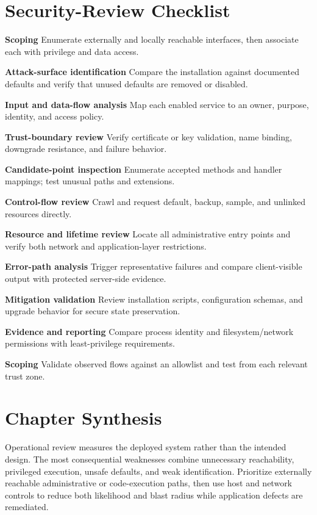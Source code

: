 \documentclass[11pt,letterpaper]{article}
\begin{document}
\section{Security-Review Checklist}
\begin{CornellChecklist}
\item \textbf{Scoping}
Enumerate externally and locally reachable interfaces, then associate each with privilege and data access.
\item \textbf{Attack-surface identification}
Compare the installation against documented defaults and verify that unused defaults are removed or disabled.
\item \textbf{Input and data-flow analysis}
Map each enabled service to an owner, purpose, identity, and access policy.
\item \textbf{Trust-boundary review}
Verify certificate or key validation, name binding, downgrade resistance, and failure behavior.
\item \textbf{Candidate-point inspection}
Enumerate accepted methods and handler mappings; test unusual paths and extensions.
\item \textbf{Control-flow review}
Crawl and request default, backup, sample, and unlinked resources directly.
\item \textbf{Resource and lifetime review}
Locate all administrative entry points and verify both network and application-layer restrictions.
\item \textbf{Error-path analysis}
Trigger representative failures and compare client-visible output with protected server-side evidence.
\item \textbf{Mitigation validation}
Review installation scripts, configuration schemas, and upgrade behavior for secure state preservation.
\item \textbf{Evidence and reporting}
Compare process identity and filesystem/network permissions with least-privilege requirements.
\item \textbf{Scoping}
Validate observed flows against an allowlist and test from each relevant trust zone.
\end{CornellChecklist}
\section{Chapter Synthesis}
Operational review measures the deployed system rather than the intended design. The most consequential weaknesses combine unnecessary reachability, privileged execution, unsafe defaults, and weak identification. Prioritize externally reachable administrative or code-execution paths, then use host and network controls to reduce both likelihood and blast radius while application defects are remediated.
\end{document}
